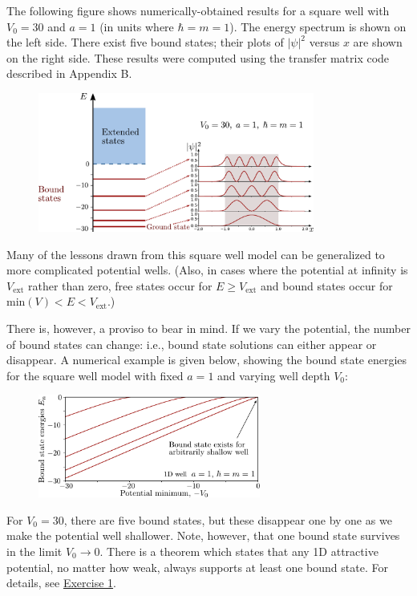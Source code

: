 \documentclass[pra,12pt]{revtex4}
\begin{document}
The following figure shows numerically-obtained results for a square
well with $V_0 = 30$ and $a=1$ (in units where $\hbar = m =1$).  The
energy spectrum is shown on the left side.  There exist five bound
states; their plots of $|\psi|^2$ versus $x$ are shown on the right
side.  These results were computed using the transfer matrix code
described in Appendix B.

\begin{figure}[h]
  \centering\includegraphics[width=0.81\textwidth]{boundvsextended}
\end{figure}

Many of the lessons drawn from this square well model can be
generalized to more complicated potential wells.  (Also, in cases
where the potential at infinity is $V_{\textrm{ext}}$ rather than
zero, free states occur for $E \ge V_{\textrm{ext}}$ and bound states
occur for $\textrm{min}(V) < E < V_{\textrm{ext}}$.)

There is, however, a proviso to bear in mind.  If we vary the
potential, the number of bound states can change: i.e., bound state
solutions can either appear or disappear.  A numerical example is
given below, showing the bound state energies for the square well
model with fixed $a = 1$ and varying well depth $V_0$:

\begin{figure}[h]
  \centering\includegraphics[width=0.65\textwidth]{boundstate1d}
\end{figure}

For $V_0 = 30$, there are five bound states, but these disappear one
by one as we make the potential well shallower.  Note, however, that
one bound state survives in the limit $V_0 \rightarrow 0$.  There is a
theorem which states that any 1D attractive potential, no matter how
weak, always supports at least one bound state.  For details, see
\hyperref[ex:boundstate]{Exercise 1}.
\end{document}
